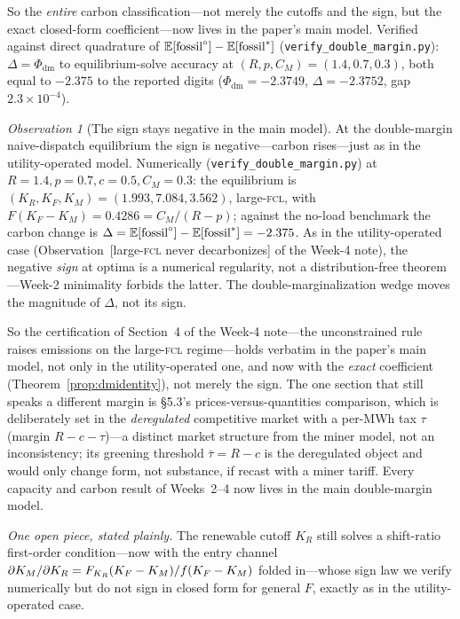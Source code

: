 \documentclass[11pt,reqno]{amsart}
\theoremstyle{plain}\newtheorem{theorem}{Theorem}\newtheorem{proposition}[theorem]{Proposition}
\theoremstyle{remark}\newtheorem{remark}[theorem]{Remark}\newtheorem{observation}[theorem]{Observation}
\newcommand{\KR}{K_R}\newcommand{\KF}{K_F}\newcommand{\KM}{K_M}
\newcommand{\CM}{C_M}\newcommand{\CF}{C_F}\newcommand{\CR}{C_R}
\newcommand{\E}{\mathbb{E}}\newcommand{\bp}{\beta+p}
\begin{document}
So the \emph{entire} carbon classification---not merely the cutoffs and the sign, but the exact
closed-form coefficient---now lives in the paper's main model. Verified against direct
quadrature of $\E[\fossil^{\circ}]-\E[\fossil^{*}]$ (\texttt{verify\_double\_margin.py}):
$\Delta=\Phi_{\mathrm{dm}}$ to equilibrium-solve accuracy at
$(R,p,\CM)=(1.4,0.7,0.3)$, both equal to $-2.375$ to the reported digits ($\Phi_{\mathrm{dm}}=-2.3749$, $\Delta=-2.3752$, gap $2.3\times10^{-4}$).
\begin{observation}[The sign stays negative in the main model]\label{prop:dmcarbon}
At the double-margin naive-dispatch equilibrium the sign is negative---carbon rises---just as
in the utility-operated model. Numerically (\texttt{verify\_double\_margin.py}) at
$R=1.4,p=0.7,c=0.5,\CM=0.3$: the equilibrium is $(\KR,\KF,\KM)=(1.993,7.084,3.562)$,
large-\textsc{fcl}, with $F(\KF-\KM)=0.4286=\CM/(R-p)$; against the no-load benchmark the
carbon change is $\Delta=\E[\fossil^{\circ}]-\E[\fossil^{*}]=-2.375$. As in the utility-operated
case (Observation~[large-\textsc{fcl} never decarbonizes] of the Week-4 note), the negative
\emph{sign} at optima is a numerical regularity, not a distribution-free theorem---Week-2
minimality forbids the latter. The double-marginalization wedge moves the magnitude of
$\Delta$, not its sign.
\end{observation}
So the certification of Section~4 of the Week-4 note---the unconstrained rule raises emissions
on the large-\textsc{fcl} regime---holds verbatim in the paper's main model, not only in the
utility-operated one, and now with the \emph{exact} coefficient
(Theorem~\ref{prop:dmidentity}), not merely the sign. The one section that still speaks a
different margin is \S5.3's prices-versus-quantities comparison, which is deliberately set in
the \emph{deregulated} competitive market with a per-MWh tax $\tau$ (margin $R-c-\tau$)---a
distinct market structure from the miner model, not an inconsistency; its greening threshold
$\bar\tau=R-c$ is the deregulated object and would only change form, not substance, if recast
with a miner tariff. Every capacity and carbon result of Weeks~2--4 now lives in the main
double-margin model.

\emph{One open piece, stated plainly.} The renewable cutoff $\KR$ still solves a shift-ratio
first-order condition---now with the entry channel $\partial\KM/\partial\KR=\FKR(\KF-\KM)/f(\KF-\KM)$
folded in---whose sign law we verify numerically but do not sign in closed form for general
$F$, exactly as in the utility-operated case.
\end{document}
